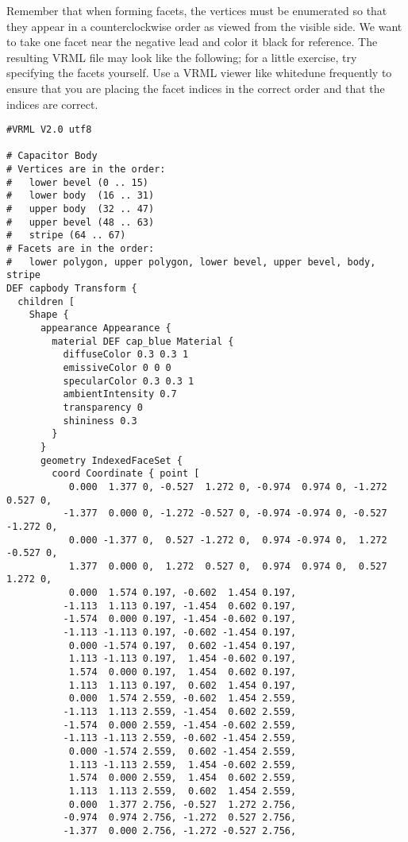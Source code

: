 \documentclass[a4paper, dvipdfm]{article}
\begin{document}
Remember that when forming facets, the vertices must be enumerated so that they appear
in a counterclockwise order as viewed from the visible side.  We want to take one facet
near the negative lead and color it black for reference. The resulting VRML file may
look like the following; for a little exercise, try specifying the facets yourself.
Use a VRML viewer like whitedune frequently to ensure that you are placing the facet
indices in the correct order and that the indices are correct.

\begin{verbatim}
#VRML V2.0 utf8

# Capacitor Body
# Vertices are in the order:
#   lower bevel (0 .. 15)
#   lower body  (16 .. 31)
#   upper body  (32 .. 47)
#   upper bevel (48 .. 63)
#   stripe (64 .. 67)
# Facets are in the order:
#   lower polygon, upper polygon, lower bevel, upper bevel, body, stripe
DEF capbody Transform {
  children [
    Shape {
      appearance Appearance {
        material DEF cap_blue Material {
          diffuseColor 0.3 0.3 1
          emissiveColor 0 0 0
          specularColor 0.3 0.3 1
          ambientIntensity 0.7
          transparency 0
          shininess 0.3
        }
      }
      geometry IndexedFaceSet {
        coord Coordinate { point [
           0.000  1.377 0, -0.527  1.272 0, -0.974  0.974 0, -1.272  0.527 0,
          -1.377  0.000 0, -1.272 -0.527 0, -0.974 -0.974 0, -0.527 -1.272 0,
           0.000 -1.377 0,  0.527 -1.272 0,  0.974 -0.974 0,  1.272 -0.527 0,
           1.377  0.000 0,  1.272  0.527 0,  0.974  0.974 0,  0.527  1.272 0,
           0.000  1.574 0.197, -0.602  1.454 0.197,
          -1.113  1.113 0.197, -1.454  0.602 0.197,
          -1.574  0.000 0.197, -1.454 -0.602 0.197,
          -1.113 -1.113 0.197, -0.602 -1.454 0.197,
           0.000 -1.574 0.197,  0.602 -1.454 0.197,
           1.113 -1.113 0.197,  1.454 -0.602 0.197,
           1.574  0.000 0.197,  1.454  0.602 0.197,
           1.113  1.113 0.197,  0.602  1.454 0.197,
           0.000  1.574 2.559, -0.602  1.454 2.559,
          -1.113  1.113 2.559, -1.454  0.602 2.559,
          -1.574  0.000 2.559, -1.454 -0.602 2.559,
          -1.113 -1.113 2.559, -0.602 -1.454 2.559,
           0.000 -1.574 2.559,  0.602 -1.454 2.559,
           1.113 -1.113 2.559,  1.454 -0.602 2.559,
           1.574  0.000 2.559,  1.454  0.602 2.559,
           1.113  1.113 2.559,  0.602  1.454 2.559,
           0.000  1.377 2.756, -0.527  1.272 2.756,
          -0.974  0.974 2.756, -1.272  0.527 2.756,
          -1.377  0.000 2.756, -1.272 -0.527 2.756,

\end{verbatim}
\end{document}
